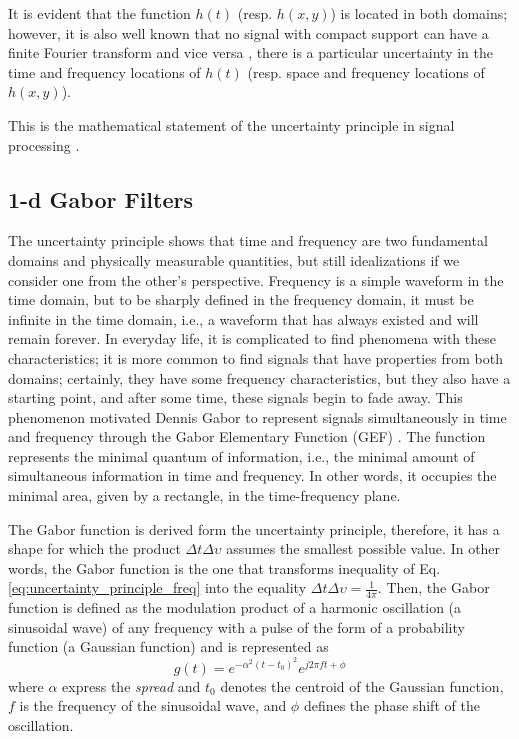 \documentclass[journal]{IEEEtran}
\begin{document}

It is evident that the function $h(t)$ (resp. $h(x, y)$) is located in both domains; however, it is also well known that no signal with compact support can have a finite Fourier transform and vice versa \cite{Bracewell:FourierBook:1999}, there is a particular uncertainty in the time and frequency locations of $h(t)$ (resp. space and frequency locations of $h(x, y)$).

This is the mathematical statement of the uncertainty principle in signal processing \cite{Petrou.Sevilla:Book:2006}.

\subsection{1-d Gabor Filters}
The uncertainty principle shows that time and frequency are two fundamental domains and physically measurable quantities, but still idealizations if we consider one from the other's perspective. Frequency is a simple waveform in the time domain, but to be sharply defined in the frequency domain, it must be infinite in the time domain, i.e., a waveform that has always existed and will remain forever. In everyday life, it is complicated to find phenomena with these characteristics; it is more common to find signals that have properties from both domains; certainly, they have some frequency characteristics, but they also have a starting point, and after some time, these signals begin to fade away. This phenomenon motivated Dennis Gabor to represent signals simultaneously in time and frequency through the Gabor Elementary Function (GEF) \cite{Gabor:JIEE:1946}. The function represents the minimal quantum of information, i.e., the minimal amount of simultaneous information in time and frequency. In other words, it occupies the minimal area, given by a rectangle, in the time-frequency plane.  

The Gabor function is derived form the uncertainty principle, therefore, it has a shape for which the product $\Delta t \Delta \upsilon$ assumes the smallest possible value. In other words, the Gabor function is the one that transforms inequality of Eq. \eqref{eq:uncertainty_principle_freq} into the equality $\Delta t \Delta \upsilon = \frac{1}{4 \pi}$. Then, the Gabor function is defined as the modulation product of a harmonic oscillation (a sinusoidal wave) of any frequency with a pulse of the form of a probability function (a Gaussian function) \cite{Gabor:JIEE:1946} and is represented as
\begin{equation}\label{eq:gabor_function_1d_time}
    g(t) =  e ^{-\alpha^2(t-t_0)^2} e ^{j 2 \pi f t + \phi}
\end{equation}
where $\alpha$ express the \textit{spread} and $t_0$ denotes the centroid of the Gaussian function, $f$ is the frequency of the sinusoidal wave, and $\phi$ defines the phase shift of the oscillation.
\end{document}
